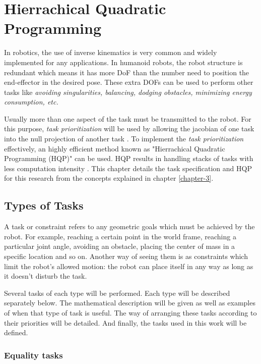 \chapter{Hierrachical Quadratic Programming}

In robotics, the use of inverse kinematics is very common and widely implemented for any applications. In humanoid robots, the robot structure
is redundant which means it has more DoF than the number need to position the end-effector in the desired pose. These extra DOFs can be used to
perform other tasks like \textit{avoiding singularities, balancing, dodging obstacles, minimizing energy consumption, etc.} 

Usually more than one aspect of the task must be transmitted to the robot. For this purpose, \textit{task prioritization} will be used by allowing the jacobian of one task 
into the null projection of another task \cite{khalil2004modeling}. To implement the \textit{task prioritization} effectively, an highly efficient method known as 
"Hierrachical Quadratic Programming (HQP)" can be used. HQP results in handling stacks of tasks with less computation intensity \cite{escande2014hierarchical} . This chapter details the task specification and HQP for this
research from the concepts explained in chapter \ref{chapter-3}.

\section{Types of Tasks}

A task or constraint refers to any geometric goals which must be achieved by the robot. For example, reaching a certain point in the world frame, reaching a 
particular joint angle, avoiding an obstacle, placing the center of mass in a specific location and so on. Another way of seeing them is as constraints 
which limit the robot’s allowed motion: the robot can place itself in any way as long as it doesn’t disturb the task.

Several tasks of each type will be performed. Each type will be described separately below. The mathematical description will be given as well as 
examples of when that type of task is useful. The way of arranging these tasks according to their priorities will be detailed. And finally, the tasks 
used in this work will be defined.

\subsection{Equality tasks}

